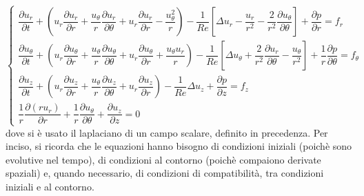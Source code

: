 \begin{equation}
\begin{cases}
 \dfrac{\partial u_r}{\partial t}      + \left( u_r \dfrac{\partial u_r}{\partial r} + \dfrac{u_\theta}{r}\dfrac{\partial u_r}{\partial \theta} +
                u_r \dfrac{\partial u_r}{\partial r} - \dfrac{u_\theta^2}{r} \right) - \dfrac{1}{Re} \left[ 
                \Delta u_r - \dfrac{u_r}{r^2} - \dfrac{2}{r^2} \dfrac{\partial u_\theta}{\partial \theta}  \right] 
                + \dfrac{\partial p}{\partial r} = f_r   \\
 \dfrac{\partial u_\theta}{\partial t} + \left( u_r \dfrac{\partial u_\theta}{\partial r} + \dfrac{u_\theta}{r}\dfrac{\partial u_\theta}{\partial \theta} +
                u_r \dfrac{\partial u_\theta}{\partial r} + \dfrac{u_\theta u_r}{r} \right) - \dfrac{1}{Re} \left[ 
                \Delta u_\theta + \dfrac{2}{r^2} \dfrac{\partial u_r}{\partial \theta} - \dfrac{u_\theta}{r^2}  \right] 
                + \dfrac{1}{r}\dfrac{\partial p}{\partial \theta}= f_\theta \\
 \dfrac{\partial u_z}{\partial t}      + \left( u_r \dfrac{\partial u_z}{\partial r} + \dfrac{u_\theta}{r}\dfrac{\partial u_z}{\partial \theta} +
                u_r \dfrac{\partial u_z}{\partial r} \right) - \dfrac{1}{Re}  \Delta u_z  + \dfrac{\partial p}{\partial z} = f_z \\
 \dfrac{1}{r}\dfrac{\partial (r u_r)}{\partial r} + \dfrac{1}{r}\dfrac{\partial u_\theta}{\partial \theta} +
                        \dfrac{\partial u_z}{\partial z} = 0
\end{cases}
\end{equation} 
dove si è usato il laplaciano di un campo scalare, definito in precedenza. Per inciso, si ricorda che le equazioni hanno bisogno
 di condizioni iniziali (poichè sono evolutive nel tempo), di condizioni al contorno (poichè compaiono derivate spaziali) e,
 quando necessario, di condizioni di compatibilità, tra condizioni iniziali e al contorno.

 
 
 
